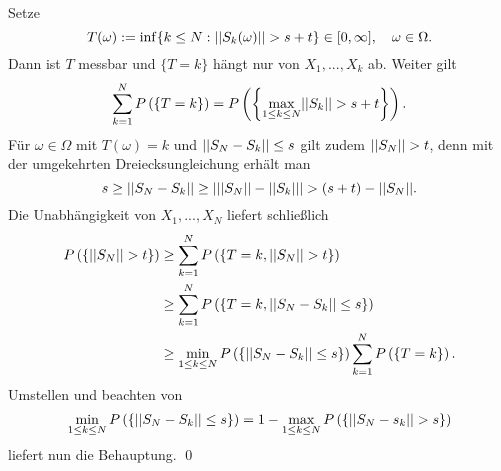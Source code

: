 \begin{proof*}
    Setze 
    $$
        T(\omega) := \inf\{k \leq N: \lvert\lvert S_k(\omega) \rvert\rvert > s + t\} \in [0, \infty], \quad \omega \in \Omega. 
    $$
    Dann ist $T$ messbar und $\{T = k\}$ hängt nur von $X_1,...,X_k$ ab. Weiter gilt 
    $$
        \sum_{k=1}^N P\left(\left\{ T = k \right\}\right) = P\left(\left\{ \max_{1\leq k \leq N}\lvert\lvert S_k \rvert\rvert > s+t \right\}\right).
    $$
    Für $\omega \in \Omega$ mit $T(\omega) = k$ und $\lvert\lvert S_N - S_k \rvert\rvert \leq s$ gilt zudem $\lvert\lvert S_N \rvert\rvert > t$, denn mit der umgekehrten Dreiecksungleichung erhält man
    $$
        s \geq \lvert\lvert S_N - S_k \rvert\rvert \geq \left| \lvert\lvert S_N \rvert\rvert-\lvert\lvert S_k \rvert\rvert \right| > (s+t) - \lvert\lvert S_N \rvert\rvert.
    $$
    Die Unabhängigkeit von $X_1,...,X_N$ liefert schließlich
    \begin{align*}
        P\left(\left\{ \lvert\lvert S_N \rvert\rvert > t \right\}\right) &\geq \sum_{k=1}^N P\left(\left\{ T=k, \lvert\lvert S_N \rvert\rvert > t \right\}\right)  \\\
                              &\geq \sum_{k=1}^N P\left(\left\{ T=k, \lvert\lvert S_N - S_k \rvert\rvert \leq s \right\}\right) \\\
                              &\geq \min_{1\leq k \leq N}P\left(\left\{ \lvert\lvert S_N-S_k \rvert\rvert \leq s \right\}\right) \sum_{k=1}^N P\left(\left\{ T=k \right\}\right). 
    \end{align*}
    Umstellen und beachten von 
    $$
        \min_{1\leq k \leq N}P\left(\left\{ \lvert\lvert S_N-S_k \rvert\rvert \leq s \right\}\right) = 1 - \max_{1\leq k \leq N}P\left(\left\{ \lvert\lvert S_N - s_k \rvert\rvert > s \right\}\right)
    $$
    liefert nun die Behauptung. \qed
\end{proof*}